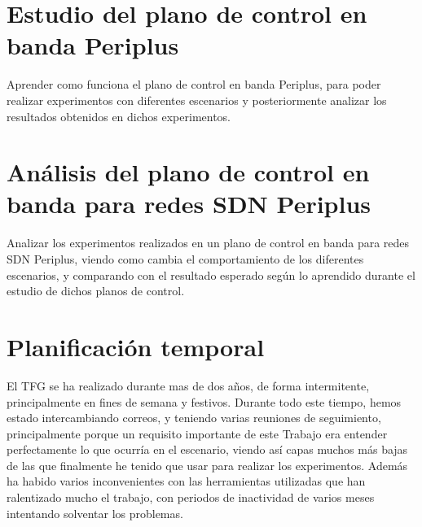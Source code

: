 \documentclass[a4paper, 12pt]{book}
\begin{document}
	
	\section{Estudio del plano de control en banda Periplus}
	\label{sec:objetivos-periplus}
	
	Aprender como funciona el plano de control en banda Periplus, para poder realizar experimentos con diferentes escenarios y posteriormente analizar los resultados obtenidos en dichos experimentos.
	
	\section{Análisis del plano de control en banda para redes SDN Periplus}
	
	Analizar los experimentos realizados en un plano de control en banda para redes SDN Periplus, viendo como cambia el comportamiento de los diferentes escenarios, y comparando con el resultado esperado según lo aprendido durante el estudio de dichos planos de control.
	\label{sec:objetivos-analisis-periplus}
	
	\section{Planificación temporal}
	\label{sec:planificacion-temporal}
	
	El TFG se ha realizado durante mas de dos años, de forma intermitente, principalmente en fines de semana y festivos. Durante todo este tiempo, hemos estado intercambiando correos, y teniendo varias reuniones de seguimiento, principalmente porque un requisito importante de este Trabajo era entender perfectamente lo que ocurría en el escenario, viendo así capas muchos más bajas de las que finalmente he tenido que usar para realizar los experimentos.
	Además ha habido varios inconvenientes con las herramientas utilizadas que han ralentizado mucho el trabajo, con periodos de inactividad de varios meses intentando solventar los problemas.
	
	
	
	\cleardoublepage
	
	
	
\end{document}
